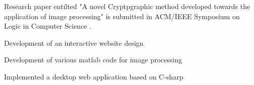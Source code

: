 \begin{cventries}
	\cventry
	{} %
	{} %
	{} %
	{} %
	{
		\begin{cvitems}
			\item { Research paper entilted "A novel Cryptpgraphic method developed towards the application of image processing" is submitted in ACM/IEEE Symposium on Logic in Computer Science .} 
			\item{Development of an interactive website design}
			\item{ Development of various matlab code for image processing}	
			\item {Implemented a desktop web application based on C-sharp}
			\end{cvitems}
	}

\end{cventries}